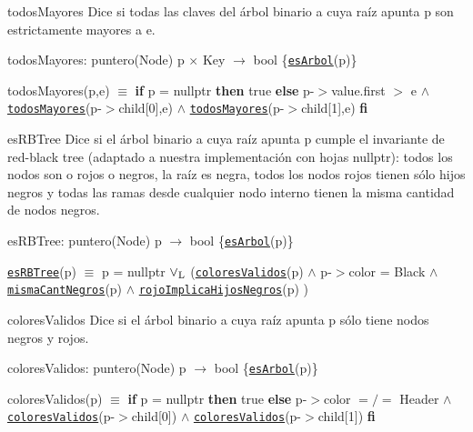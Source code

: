 \begin{DoxyParagraph}{todos\-Mayores}
Dice si todas las claves del árbol binario a cuya raíz apunta p son estrictamente mayores a e.

todos\-Mayores\-: puntero(\-Node) p $\times$ Key $\to$ bool \{\href{axiomas.html#esArbol}{\tt es\-Arbol}(p)\} \par
 todos\-Mayores(p,e) $\equiv$ {\bfseries if} p = nullptr {\bfseries then} true {\bfseries else} p-\/$>$value.\-first $>$ e $\land$ \href{axiomas.html#todosMayores}{\tt todos\-Mayores}(p-\/$>$child\mbox{[}0\mbox{]},e) $\land$ \href{axiomas.html#todosMayores}{\tt todos\-Mayores}(p-\/$>$child\mbox{[}1\mbox{]},e) {\bfseries fi} 


\end{DoxyParagraph}
\begin{DoxyParagraph}{es\-R\-B\-Tree}
Dice si el árbol binario a cuya raíz apunta p cumple el invariante de red-\/black tree (adaptado a nuestra implementación con hojas nullptr)\-: todos los nodos son o rojos o negros, la raíz es negra, todos los nodos rojos tienen sólo hijos negros y todas las ramas desde cualquier nodo interno tienen la misma cantidad de nodos negros.

es\-R\-B\-Tree\-: puntero(\-Node) p $\to$ bool \{\href{axiomas.html#esArbol}{\tt es\-Arbol}(p)\} \par
 \href{axiomas.html#esRBTree}{\tt es\-R\-B\-Tree}(p) $\equiv$ p = nullptr $\lor_{\rm L}$ (\href{axiomas.html#coloresValidos}{\tt colores\-Validos}(p) $\land$ p-\/$>$color = Black $\land$ \href{axiomas.html#mismaCantNegros}{\tt misma\-Cant\-Negros}(p) $\land$ \href{axiomas.html#rojoImplicaHijosNegros}{\tt rojo\-Implica\-Hijos\-Negros}(p) )


\end{DoxyParagraph}
\begin{DoxyParagraph}{colores\-Validos}
Dice si el árbol binario a cuya raíz apunta p sólo tiene nodos negros y rojos.

colores\-Validos\-: puntero(\-Node) p $\to$ bool \{\href{axiomas.html#esArbol}{\tt es\-Arbol}(p)\} \par
 colores\-Validos(p) $\equiv$ {\bfseries if} p = nullptr {\bfseries then} true {\bfseries else} p-\/$>$color $=/=$ Header $\land$ \href{axiomas.html#coloresValidos}{\tt colores\-Validos}(p-\/$>$child\mbox{[}0\mbox{]}) $\land$ \href{axiomas.html#coloresValidos}{\tt colores\-Validos}(p-\/$>$child\mbox{[}1\mbox{]}) {\bfseries fi} 


\end{DoxyParagraph}
